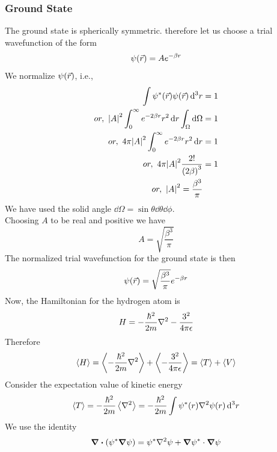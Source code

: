 	\subsubsection{Ground State}
	The ground state is spherically symmetric. therefore let us choose a trial wavefunction of the form
	\begin{align}
		\psi\qty(\vec{r}) = A e^{-\beta r}
	\end{align}
	We normalize $\psi\qty(\vec{r})$, i.e.,
	\begin{align*}
		\int \psi^*\qty(\vec{r}) \psi\qty(\vec{r}) \dd[3]{r} &= 1 \\
		or, \ \abs{A}^2 \int_{0}^{\infty} e^{-2\beta r} r^2 \dd{r} \int_{\Omega} \dd{\Omega} &= 1 \\
		or, \ 4\pi \abs{A}^2 \int_{0}^{\infty} e^{-2\beta r} r^2 \dd{r} &= 1 \\
		or, \ 4\pi \abs{A}^2 \frac{2 !}{\qty(2\beta)^3} &= 1 \\
		or, \ \abs{A}^2 = \frac{\beta^3}{\pi}
	\end{align*}
	We have used the solid angle $\dd{\Omega} = \sin\theta \dd{\theta} \dd{\phi}$.\\
	
	Choosing $A$ to be real and positive we have
	\begin{equation}
		A = \sqrt{\frac{\beta^3}{\pi}}
	\end{equation}
	The normalized trial wavefunction for the ground state is then
	\begin{equation}
		\psi\qty(\vec{r}) = \sqrt{\frac{\beta^3}{\pi}} e ^{-\beta r}
	\end{equation}
	Now, the Hamiltonian for the hydrogen atom is
	\begin{align}
		H = - \frac{\hbar^2}{2 m} \laplacian{} - \frac{3^2}{4\pi\epsilon}
	\end{align}
	Therefore
	\begin{align}
		\expval{H} = \expval{- \frac{\hbar^2}{2 m} \laplacian{}}  + \expval{- \frac{3^2}{4\pi\epsilon}}  = \expval{T}  + \expval{V} 
	\end{align}
	Consider the expectation value of kinetic energy
	\begin{align}
		\expval{T}  =  - \frac{\hbar^2}{2 m}\expval{\laplacian{}} = - \frac{\hbar^2}{2 m} \int \psi^*\qty(r) \laplacian{\psi\qty(r)} \dd[3]{r}
	\end{align}
	We use the identity
	\begin{align}
		\divergence \qty(\psi^* \grad{\psi}) = \psi^*\laplacian{\psi} + \grad{\psi^*} \cdot \grad{\psi}
	\end{align}
	
